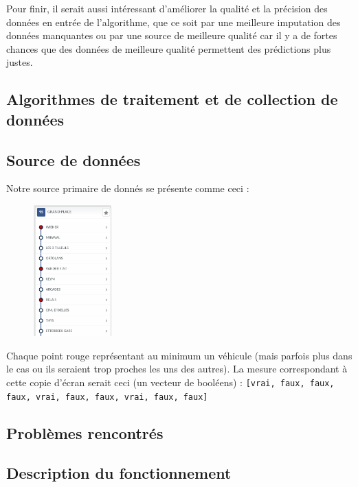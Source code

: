 \documentclass[letterpaper]{article}
\begin{document}
Pour finir, il serait aussi intéressant d'améliorer la qualité et la précision des données en entrée de l'algorithme, que ce soit par une meilleure imputation des données manquantes ou par une source de meilleure qualité car il y a de fortes chances que des données de meilleure qualité permettent des prédictions plus justes.

\footnotesize




\newpage
\begin{appendices}
\section{Algorithmes de traitement et de collection de données}
\subsection{Source de données}
\label{align}
Notre source primaire de donnés se présente comme ceci :

\begin{figure}[h]
   \centerline{\includegraphics[width=3cm]{mstib.png}}
\end{figure}

Chaque point rouge représentant au minimum un véhicule (mais parfois plus dans le cas ou ils seraient trop proches les uns des autres). La mesure correspondant à cette copie d'écran serait ceci (un vecteur de booléens) : \texttt{[vrai, faux, faux, faux, vrai, faux, faux, vrai, faux, faux]}

\subsection{Problèmes rencontrés}

\subsection{Description du fonctionnement}


\end{appendices}
\end{document}
